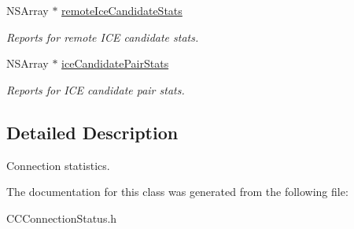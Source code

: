 \begin{DoxyCompactItemize}
\mbox{\label{interface_c_c_connection_status_a5e8f0df87527cbcb83ac9745edda02e5}} 
N\+S\+Array $\ast$ \hyperlink{interface_c_c_connection_status_a5e8f0df87527cbcb83ac9745edda02e5}{remote\+Ice\+Candidate\+Stats}
\begin{DoxyCompactList}\small\item\em Reports for remote I\+CE candidate stats. \end{DoxyCompactList}\item 
\mbox{\label{interface_c_c_connection_status_a3c8ded981324a3460350167d16eecde6}} 
N\+S\+Array $\ast$ \hyperlink{interface_c_c_connection_status_a3c8ded981324a3460350167d16eecde6}{ice\+Candidate\+Pair\+Stats}
\begin{DoxyCompactList}\small\item\em Reports for I\+CE candidate pair stats. \end{DoxyCompactList}\end{DoxyCompactItemize}


\subsection{Detailed Description}
Connection statistics. 

The documentation for this class was generated from the following file\+:\begin{DoxyCompactItemize}
\item 
C\+C\+Connection\+Status.\+h\end{DoxyCompactItemize}
